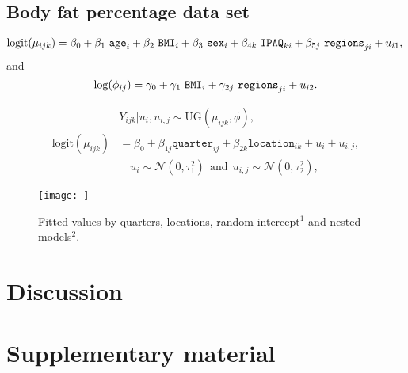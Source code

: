 \documentclass[a4paper,12pt]{article}
\begin{document}
\subsection{Body fat percentage data set}
\label{bodyfat}

\begin{equation}
\mathrm{logit}(\mu_{ijk}) = \beta_{0} + \beta_{1}~\mbox{\texttt{age}}_i + \beta_{2}~\mbox{\texttt{BMI}}_i + \beta_{3}~\mbox{\texttt{sex}}_i + \beta_{4k}~\mbox{\texttt{IPAQ}}_{ki} + \beta_{5j}~\mbox{\texttt{regions}}_{ji} + u_{i1}, \nonumber \\
\end{equation}
and
\begin{equation}
\log(\phi_{ij})  = \gamma_{0} + \gamma_{1}~\mbox{\texttt{BMI}}_i + \gamma_{2j}~\mbox{\texttt{regions}}_{ji} + u_{i2}. \nonumber \\
\end{equation}

\begin{align}
\label{eq:linearprediqa}
& Y_{ijk} | u_i, u_{i,j} \sim \mathrm{UG}(\mu_{ijk}, \phi),   \nonumber \\
\mathrm{logit}(\mu_{ijk}) & =  \beta_0 + \beta_{1j}\texttt{quarter}_{ij} + \beta_{2k}\texttt{location}_{ik} + u_{i} + u_{i,j}, \nonumber \\
 &  \quad  u_i \sim \mathcal{N}(0, \tau_1^2)~~\mbox{and}~~u_{i,j} \sim \mathcal{N}(0, \tau_2^2),  \nonumber 
\end{align} 

\begin{figure}[H]
 \centering
 \texttt{[image: ]}
 \caption{Fitted values by quarters, locations, random intercept$^1$ and
          nested models$^2$.}
 \label{fig:FittedIQA}
\end{figure}

\section{Discussion}
\label{discussion}

\section*{Supplementary material}




\end{document}
